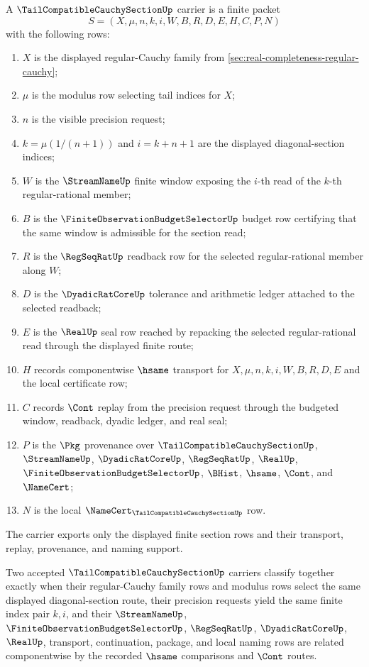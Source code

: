 \begin{definition}
\label{def:tail-compatible-cauchy-section-carrier}
A $\TailCompatibleCauchySectionUp$ carrier is a finite packet
$$
S=(X,\mu,n,k,i,W,B,R,D,E,H,C,P,N)
$$
with the following rows:
\begin{enumerate}
\item $X$ is the displayed regular-Cauchy family from \autoref{sec:real-completeness-regular-cauchy};
\item $\mu$ is the modulus row selecting tail indices for $X$;
\item $n$ is the visible precision request;
\item $k=\mu(1/(n+1))$ and $i=k+n+1$ are the displayed diagonal-section indices;
\item $W$ is the $\StreamNameUp$ finite window exposing the $i$-th read of the $k$-th regular-rational member;
\item $B$ is the $\FiniteObservationBudgetSelectorUp$ budget row certifying that the same window is admissible for the section read;
\item $R$ is the $\RegSeqRatUp$ readback row for the selected regular-rational member along $W$;
\item $D$ is the $\DyadicRatCoreUp$ tolerance and arithmetic ledger attached to the selected readback;
\item $E$ is the $\RealUp$ seal row reached by repacking the selected regular-rational read through the displayed finite route;
\item $H$ records componentwise $\hsame$ transport for $X,\mu,n,k,i,W,B,R,D,E$ and the local certificate row;
\item $C$ records $\Cont$ replay from the precision request through the budgeted window, readback, dyadic ledger, and real seal;
\item $P$ is the $\Pkg$ provenance over $\TailCompatibleCauchySectionUp$, $\StreamNameUp$, $\DyadicRatCoreUp$, $\RegSeqRatUp$, $\RealUp$, $\FiniteObservationBudgetSelectorUp$, $\BHist$, $\hsame$, $\Cont$, and $\NameCert$;
\item $N$ is the local $\NameCert_{\TailCompatibleCauchySectionUp}$ row.
\end{enumerate}
The carrier exports only the displayed finite section rows and their transport, replay, provenance, and naming support.
\end{definition}

\begin{definition}
\label{def:tail-compatible-cauchy-section-classifier}
Two accepted $\TailCompatibleCauchySectionUp$ carriers classify together exactly when their regular-Cauchy family rows and modulus rows select the same displayed diagonal-section route, their precision requests yield the same finite index pair $k,i$, and their $\StreamNameUp$, $\FiniteObservationBudgetSelectorUp$, $\RegSeqRatUp$, $\DyadicRatCoreUp$, $\RealUp$, transport, continuation, package, and local naming rows are related componentwise by the recorded $\hsame$ comparisons and $\Cont$ routes.
\end{definition}

